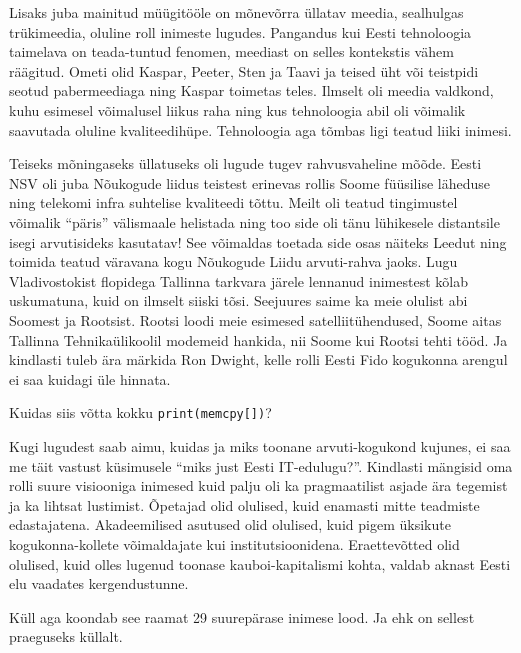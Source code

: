 Lisaks juba mainitud müügitööle on mõnevõrra üllatav meedia, sealhulgas trükimeedia, oluline roll inimeste lugudes. Pangandus kui Eesti tehnoloogia taimelava on teada-tuntud fenomen, meediast on selles kontekstis vähem räägitud. Ometi olid Kaspar, Peeter, Sten ja Taavi ja teised üht või teistpidi seotud pabermeediaga ning Kaspar toimetas teles. Ilmselt oli meedia valdkond, kuhu esimesel võimalusel liikus raha ning kus tehnoloogia abil oli võimalik saavutada oluline kvaliteedihüpe. Tehnoloogia aga tõmbas ligi teatud liiki inimesi.

Teiseks mõningaseks üllatuseks oli lugude tugev rahvusvaheline mõõde. Eesti NSV oli juba Nõukogude liidus teistest erinevas rollis Soome füüsilise läheduse ning telekomi infra suhtelise kvaliteedi tõttu. Meilt oli teatud tingimustel võimalik \enquote{päris} välismaale helistada ning too side oli tänu lühikesele distantsile isegi arvutisideks kasutatav! See võimaldas toetada side osas näiteks Leedut ning toimida teatud väravana kogu Nõukogude Liidu arvuti-rahva jaoks. Lugu Vladivostokist flopidega Tallinna tarkvara järele lennanud inimestest kõlab uskumatuna, kuid on ilmselt siiski tõsi. Seejuures saime ka meie olulist abi Soomest ja Rootsist. Rootsi loodi meie esimesed satelliitühendused, Soome aitas Tallinna Tehnikaülikoolil modemeid hankida, nii Soome kui Rootsi tehti tööd. Ja kindlasti tuleb ära märkida Ron Dwight, kelle rolli Eesti Fido kogukonna arengul ei saa kuidagi üle hinnata. 

Kuidas siis võtta kokku \verb|print(memcpy[])|? 

Kugi lugudest saab aimu, kuidas ja miks toonane arvuti-kogukond kujunes, ei saa me täit vastust küsimusele \enquote{miks just Eesti IT-edulugu?}. Kindlasti mängisid oma rolli suure visiooniga inimesed kuid palju oli ka pragmaatilist asjade ära tegemist ja ka lihtsat lustimist. Õpetajad olid olulised, kuid enamasti mitte teadmiste edastajatena. Akadeemilised asutused olid olulised, kuid pigem üksikute kogukonna-kollete võimaldajate kui institutsioonidena. Eraettevõtted olid olulised, kuid olles lugenud toonase kauboi-kapitalismi kohta, valdab aknast Eesti elu vaadates kergendustunne. 

Küll aga koondab see raamat 29 suurepärase inimese lood. Ja ehk on sellest praeguseks küllalt.
